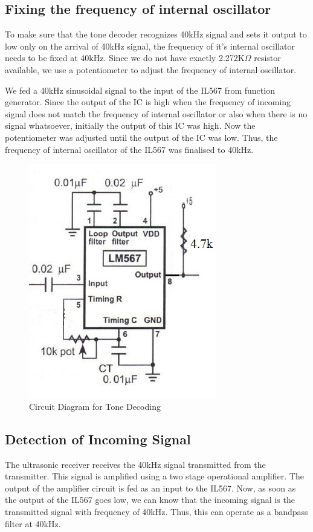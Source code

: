 \subsection{Fixing the frequency of internal oscillator}

To make sure that the tone decoder recognizes 40kHz signal and sets it output to low only on the arrival of 40kHz signal, the frequency of it's internal oscillator needs to be fixed at 40kHz. Since we do not have exactly 2.272K$\Omega$ resistor available, we use a potentiometer to adjust the frequency of internal oscillator.

We fed a 40kHz sinusoidal signal to the input of the IL567 from function generator. Since the output of the IC is high when the frequency of incoming signal does not match the frequency of internal oscillator or also when there is no signal whatsoever, initially the output of this IC was high. Now the potentiometer was adjusted until the output of the IC was low. Thus, the frequency of internal oscillator of the IL567 was finalised to 40kHz.
\begin{figure}[h]
	\centering
	\includegraphics[scale=0.7]{Images/ToneDecoder.jpg}
	\caption{Circuit Diagram for Tone Decoding}
	\label{fig:CircuitDiagramForToneDecoding}
\end{figure}

\subsection{Detection of Incoming Signal}
The ultrasonic receiver receives the 40kHz signal transmitted from the transmitter. This signal is amplified using a two stage operational amplifier. The output of the amplifier circuit is fed as an input to the IL567. Now, as soon as the output of the IL567 goes low, we can know that the incoming signal is the transmitted signal with frequency of 40kHz. Thus, this can operate as a bandpass filter at 40kHz.

